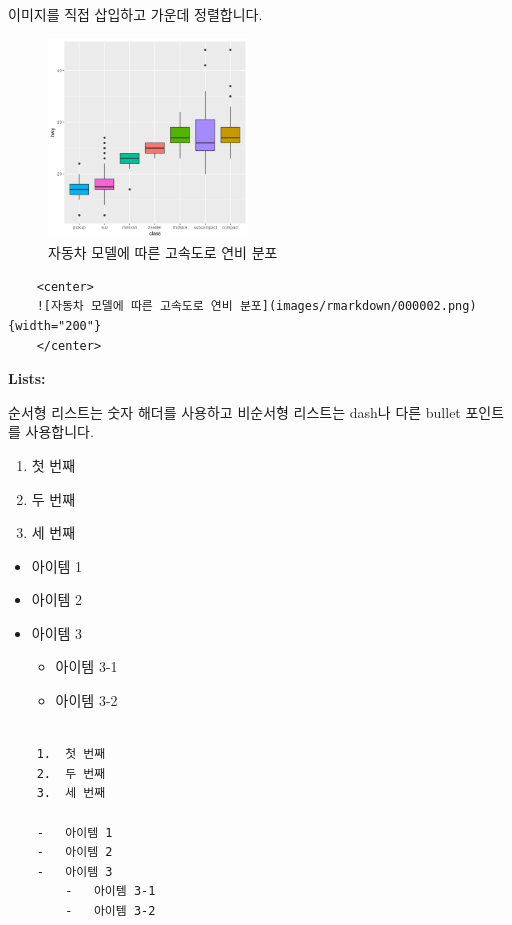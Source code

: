 \documentclass[
  a4paper,
]{book}
\providecommand{\tightlist}{%
  \setlength{\itemsep}{0pt}\setlength{\parskip}{0pt}}\usepackage{longtable,booktabs,array}
\begin{document}
이미지를 직접 삽입하고 가운데 정렬합니다.

\begin{figure}

{\centering \includegraphics[width=2.08333in,height=\textheight]{images/rmarkdown/000002.png}

}

\caption{자동차 모델에 따른 고속도로 연비 분포}

\end{figure}

\begin{verbatim}
    <center>
    ![자동차 모델에 따른 고속도로 연비 분포](images/rmarkdown/000002.png){width="200"}
    </center>
\end{verbatim}

\textbf{Lists:}

순서형 리스트는 숫자 해더를 사용하고 비순서형 리스트는 dash나 다른
bullet 포인트를 사용합니다.

\begin{enumerate}
\def\labelenumi{\arabic{enumi}.}
\tightlist
\item
  첫 번째
\item
  두 번째
\item
  세 번째
\end{enumerate}

\begin{itemize}
\tightlist
\item
  아이템 1
\item
  아이템 2
\item
  아이템 3

  \begin{itemize}
  \tightlist
  \item
    아이템 3-1
  \item
    아이템 3-2
  \end{itemize}
\end{itemize}

\begin{verbatim}

    1.  첫 번째
    2.  두 번째
    3.  세 번째
    
    -   아이템 1
    -   아이템 2
    -   아이템 3
        -   아이템 3-1
        -   아이템 3-2
\end{verbatim}
\end{document}
